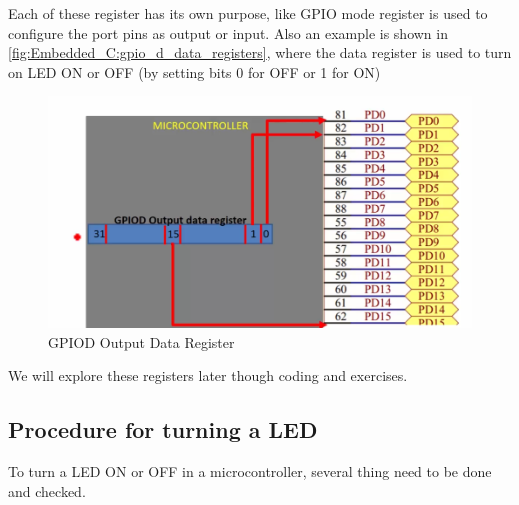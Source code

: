 \begin{itemize}
Each of these register has its own purpose, like GPIO mode register is used to configure the port pins as output or input. Also an example is shown in \autoref{fig:Embedded_C:gpio_d_data_registers}, where the data register is used to turn on LED ON or OFF (by setting bits 0 for OFF or 1 for ON)

\begin{figure}[h]
\centering
\includegraphics[scale=0.7]{Figures/Embedded_C/gpio_d_data_registers}
\caption{GPIOD Output Data Register}
\label{fig:Embedded_C:gpio_d_data_registers}
\end{figure}  

\end{itemize}

We will explore these registers later though coding and exercises.

\subsection{Procedure for turning a LED}

To turn a LED ON or OFF in a microcontroller, several thing need to be done and checked.

